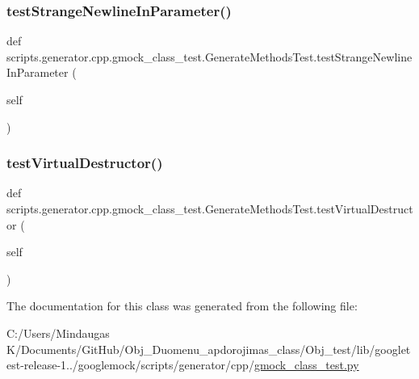 \mbox{\label{classscripts_1_1generator_1_1cpp_1_1gmock__class__test_1_1_generate_methods_test_acca63bd8327c93b4e715ae2f6800460c}} 
\subsubsection{\texorpdfstring{testStrangeNewlineInParameter()}{testStrangeNewlineInParameter()}}
{\footnotesize\ttfamily def scripts.\+generator.\+cpp.\+gmock\+\_\+class\+\_\+test.\+Generate\+Methods\+Test.\+test\+Strange\+Newline\+In\+Parameter (\begin{DoxyParamCaption}\item[{}]{self }\end{DoxyParamCaption})}

\mbox{\label{classscripts_1_1generator_1_1cpp_1_1gmock__class__test_1_1_generate_methods_test_a1ae1dc25054146a175b9317a7500c74a}} 
\subsubsection{\texorpdfstring{testVirtualDestructor()}{testVirtualDestructor()}}
{\footnotesize\ttfamily def scripts.\+generator.\+cpp.\+gmock\+\_\+class\+\_\+test.\+Generate\+Methods\+Test.\+test\+Virtual\+Destructor (\begin{DoxyParamCaption}\item[{}]{self }\end{DoxyParamCaption})}



The documentation for this class was generated from the following file\+:\begin{DoxyCompactItemize}
\item 
C\+:/\+Users/\+Mindaugas K/\+Documents/\+Git\+Hub/\+Obj\+\_\+\+Duomenu\+\_\+apdorojimas\+\_\+class/\+Obj\+\_\+test/lib/googletest-\/release-\/1../googlemock/scripts/generator/cpp/\mbox{\hyperlink{_obj__test_2lib_2googletest-release-1_88_81_2googlemock_2scripts_2generator_2cpp_2gmock__class__test_8py}{gmock\+\_\+class\+\_\+test.\+py}}\end{DoxyCompactItemize}
